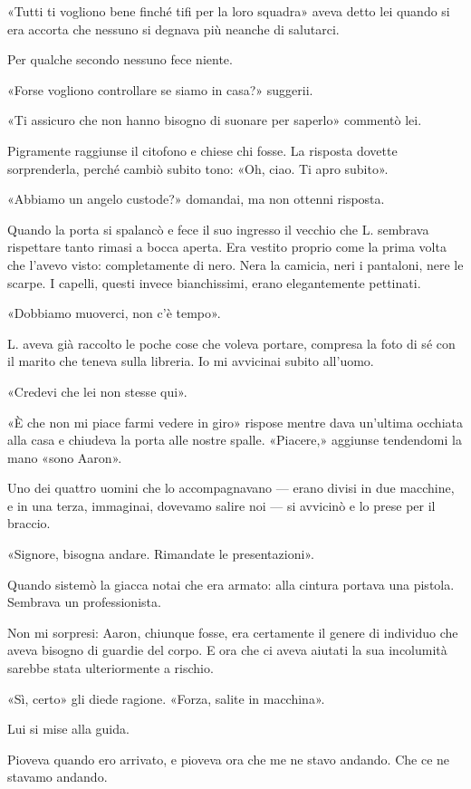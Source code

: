 \documentclass[a4paper,12pt]{book}
\begin{document}
«Tutti ti vogliono bene finché tifi per la loro squadra» aveva detto lei quando
si era accorta che nessuno si degnava più neanche di salutarci.

Per qualche secondo nessuno fece niente.

«Forse vogliono controllare se siamo in casa?» suggerii.

«Ti assicuro che non hanno bisogno di suonare per saperlo» commentò lei.

Pigramente raggiunse il citofono e chiese chi fosse. La risposta dovette
sorprenderla, perché cambiò subito tono: «Oh, ciao. Ti apro subito».

«Abbiamo un angelo custode?» domandai, ma non ottenni risposta.

Quando la porta si spalancò e fece il suo ingresso il vecchio che L. sembrava
rispettare tanto rimasi a bocca aperta. Era vestito proprio come la prima volta
che l'avevo visto: completamente di nero. Nera la camicia, neri i pantaloni,
nere le scarpe. I capelli, questi invece bianchissimi, erano elegantemente
pettinati.

«Dobbiamo muoverci, non c'è tempo».

L. aveva già raccolto le poche cose che voleva portare, compresa la foto di sé
con il marito che teneva sulla libreria. Io mi avvicinai subito all'uomo.

«Credevi che lei non stesse qui».

«È che non mi piace farmi vedere in giro» rispose mentre dava un'ultima occhiata
alla casa e chiudeva la porta alle nostre spalle. «Piacere,» aggiunse tendendomi
la mano «sono Aaron».

Uno dei quattro uomini che lo accompagnavano --- erano divisi in due macchine,
e in una terza, immaginai, dovevamo salire noi --- si avvicinò e lo prese per
il braccio.

«Signore, bisogna andare. Rimandate le presentazioni».

Quando sistemò la giacca notai che era armato: alla cintura portava una pistola.
Sembrava un professionista.

Non mi sorpresi: Aaron, chiunque fosse, era certamente il genere di individuo che
aveva bisogno di guardie del corpo. E ora che ci aveva aiutati la sua incolumità
sarebbe stata ulteriormente a rischio.

«Sì, certo» gli diede ragione. «Forza, salite in macchina».

Lui si mise alla guida.

Pioveva quando ero arrivato, e pioveva ora che me ne stavo andando. Che ce ne
stavamo andando.
\end{document}
